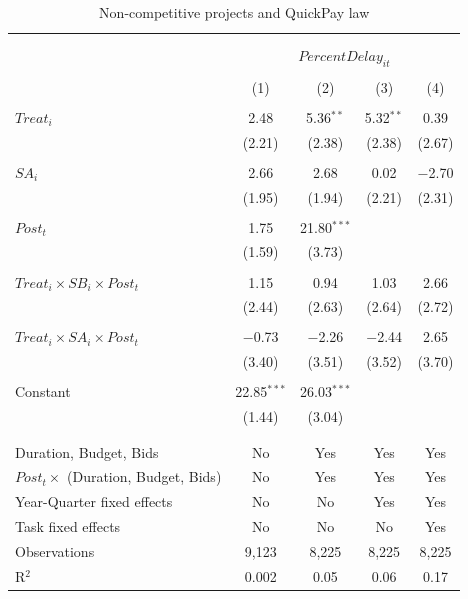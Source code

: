 \documentclass[
]{article}
\begin{document}
\begin{table}[H] \centering 
  \caption{Non-competitive projects and QuickPay law} 
  \label{} 
\small 
\begin{tabular}{@{\extracolsep{-2pt}}lcccc} 
\\[-1.8ex]\hline 
\hline \\[-1.8ex] 
\\[-1.8ex] & \multicolumn{4}{c}{$PercentDelay_{it}$  } \\ 
\\[-1.8ex] & (1) & (2) & (3) & (4)\\ 
\hline \\[-1.8ex] 
 $Treat_i$ & 2.48 & 5.36$^{**}$ & 5.32$^{**}$ & 0.39 \\ 
  & (2.21) & (2.38) & (2.38) & (2.67) \\ 
  & & & & \\ 
 $SA_i$ & 2.66 & 2.68 & 0.02 & $-$2.70 \\ 
  & (1.95) & (1.94) & (2.21) & (2.31) \\ 
  & & & & \\ 
 $Post_t$ & 1.75 & 21.80$^{***}$ &  &  \\ 
  & (1.59) & (3.73) &  &  \\ 
  & & & & \\ 
 $Treat_i \times SB_i \times Post_t$ & 1.15 & 0.94 & 1.03 & 2.66 \\ 
  & (2.44) & (2.63) & (2.64) & (2.72) \\ 
  & & & & \\ 
 $Treat_i \times SA_i \times Post_t$ & $-$0.73 & $-$2.26 & $-$2.44 & 2.65 \\ 
  & (3.40) & (3.51) & (3.52) & (3.70) \\ 
  & & & & \\ 
 Constant & 22.85$^{***}$ & 26.03$^{***}$ &  &  \\ 
  & (1.44) & (3.04) &  &  \\ 
  & & & & \\ 
\hline \\[-1.8ex] 
Duration, Budget, Bids & No & Yes & Yes & Yes \\ 
$Post_t \times $  (Duration, Budget, Bids) & No & Yes & Yes & Yes \\ 
Year-Quarter fixed effects & No & No & Yes & Yes \\ 
Task fixed effects & No & No & No & Yes \\ 
Observations & 9,123 & 8,225 & 8,225 & 8,225 \\ 
R$^{2}$ & 0.002 & 0.05 & 0.06 & 0.17 \\ 

\end{tabular}
\end{table}
\end{document}
